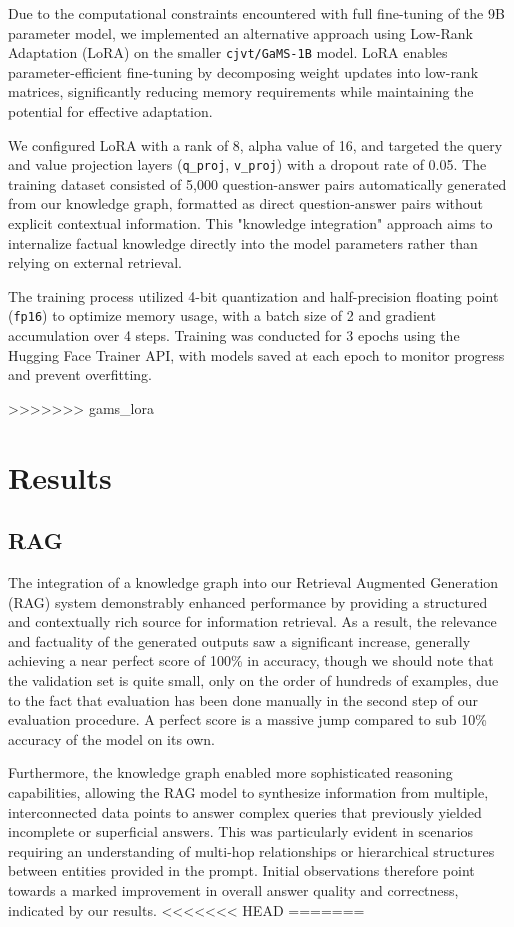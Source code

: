 \documentclass[fleqn,moreauthors,10pt]{ds_report}
\begin{document}
Due to the computational constraints encountered with full fine-tuning of the 9B parameter model, we implemented an alternative approach using Low-Rank Adaptation (LoRA) on the smaller \texttt{cjvt/GaMS-1B} model. LoRA enables parameter-efficient fine-tuning by decomposing weight updates into low-rank matrices, significantly reducing memory requirements while maintaining the potential for effective adaptation.

We configured LoRA with a rank of 8, alpha value of 16, and targeted the query and value projection layers (\texttt{q\_proj}, \texttt{v\_proj}) with a dropout rate of 0.05. The training dataset consisted of 5,000 question-answer pairs automatically generated from our knowledge graph, formatted as direct question-answer pairs without explicit contextual information. This "knowledge integration" approach aims to internalize factual knowledge directly into the model parameters rather than relying on external retrieval.

The training process utilized 4-bit quantization and half-precision floating point (\texttt{fp16}) to optimize memory usage, with a batch size of 2 and gradient accumulation over 4 steps. Training was conducted for 3 epochs using the Hugging Face Trainer API, with models saved at each epoch to monitor progress and prevent overfitting.

>>>>>>> gams_lora
\section*{Results}

\subsection*{RAG}

The integration of a knowledge graph into our Retrieval Augmented Generation (RAG) system demonstrably enhanced performance by providing a structured and contextually rich source for information retrieval. As a result, the relevance and factuality of the generated outputs saw a significant increase, generally achieving a near perfect score of 100\% in accuracy, though we should note that the validation set is quite small, only on the order of hundreds of examples, due to the fact that evaluation has been done manually in the second step of our evaluation procedure. A perfect score is a massive jump compared to sub 10\% accuracy of the model on its own.

Furthermore, the knowledge graph enabled more sophisticated reasoning capabilities, allowing the RAG model to synthesize information from multiple, interconnected data points to answer complex queries that previously yielded incomplete or superficial answers. This was particularly evident in scenarios requiring an understanding of multi-hop relationships or hierarchical structures between entities provided in the prompt. Initial observations therefore point towards a marked improvement in overall answer quality and correctness, indicated by our results.
<<<<<<< HEAD
=======
\end{document}

